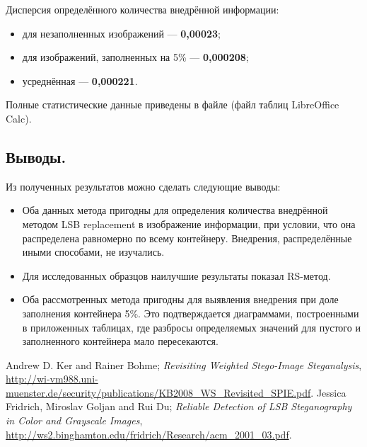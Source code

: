 \documentclass[12pt,a4paper,russian,numbers=endperiod]{scrartcl}
\begin{document}
Дисперсия определённого количества внедрённой информации:

\begin{itemize}
	\item для незаполненных изображений --- \textbf{0,00023};
	\item для изображений, заполненных на 5\% --- \textbf{0,000208};
	\item усреднённая --- \textbf{0,000221}.
\end{itemize}

Полные статистические данные приведены в файле  (файл таблиц LibreOffice Calc).

\subsection{Выводы.}

Из полученных результатов можно сделать следующие выводы:

\begin{itemize}
	\item Оба данных метода пригодны для определения количества внедрённой методом LSB replacement в изображение информации, при условии, что она распределена равномерно по всему контейнеру. Внедрения, распределённые иными способами, не изучались.
	\item Для исследованных образцов наилучшие результаты показал RS-метод.
	\item Оба рассмотренных метода пригодны для выявления внедрения при доле заполнения контейнера 5\%. Это подтверждается диаграммами, построенными в приложенных таблицах, где разбросы определяемых значений для пустого и заполненного контейнера мало пересекаются.
\end{itemize}

\begin{thebibliography}{9}
	 Andrew D. Ker and Rainer Bohme; \emph{Revisiting Weighted Stego-Image Steganalysis}, \url{http://wi-vm988.uni-muenster.de/security/publications/KB2008_WS_Revisited_SPIE.pdf}.
	 Jessica Fridrich, Miroslav Goljan and Rui Du; \emph{Reliable Detection of LSB Steganography in Color and Grayscale Images}, \url{http://ws2.binghamton.edu/fridrich/Research/acm_2001_03.pdf}.
\end{thebibliography}


\end{document}
